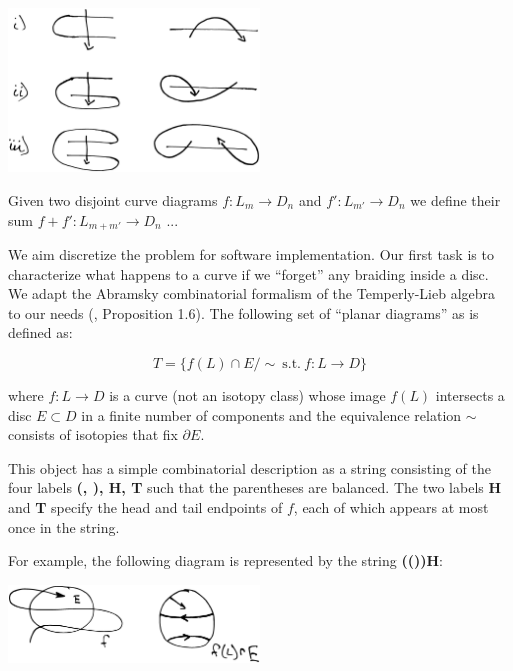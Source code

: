 \documentclass[12pt,a4paper]{article}
\begin{document}
\begin{center}
\includegraphics[width=0.5\textwidth]{snake-cases.eps}
\end{center}




Given two disjoint curve diagrams $f:L_m\to D_n$ and $f':L_{m'}\to D_n$
we define their sum  $f+f':L_{m+m'}\to D_n$ ...




We aim discretize the problem for software implementation.
Our first task is to characterize what happens to a curve
if we ``forget'' any braiding inside a disc.
We adapt the Abramsky combinatorial formalism 
of the Temperly-Lieb algebra to our needs (\cite{Abramsky08}, Proposition 1.6).
The following set of ``planar diagrams'' as is defined as:

    $$ T = \{ f(L)\cap E / \sim \ \text{s.t.}\ f:L\to D \}$$

where $f:L\to D$ is a curve (not an isotopy class)
whose image $f(L)$ intersects a disc $E\subset D$ in a finite number of components
and the equivalence relation $\sim$ consists of 
isotopies that fix $\partial E.$ %

This object has a simple combinatorial description 
as a string consisting of
the four labels {\bf (, ), H, T} such that 
the parentheses are balanced. The two labels {\bf H} and {\bf T} specify the
head and tail endpoints of $f$, each of which appears at most once in the string.

For example, the following diagram is represented by
the string {\bf(())H}:

\begin{center}
\includegraphics[width=0.5\textwidth]{planar.eps}
\end{center}
\end{document}
